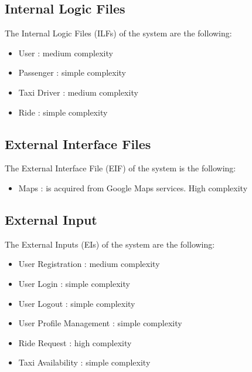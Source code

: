 \subsection{Internal Logic Files}

The Internal Logic Files (ILFs) of the system are the following:

\begin{itemize}
	
	\item User : medium complexity
	\item Passenger : simple complexity
	\item Taxi Driver : medium complexity
	\item Ride : simple complexity
	
\end{itemize}


\subsection{External Interface Files}

The External Interface File (EIF) of the system is the following:

\begin{itemize}
	
	\item Maps : is acquired from Google Maps services. High complexity
	
\end{itemize}

\subsection{External Input}

The External Inputs (EIs) of the system are the following:

\begin{itemize}
	
	\item User Registration : medium complexity
	\item User Login : simple complexity
	\item User Logout : simple complexity
	\item User Profile Management : simple complexity
	\item Ride Request : high complexity
	\item Taxi Availability : simple complexity
	
\end{itemize}

